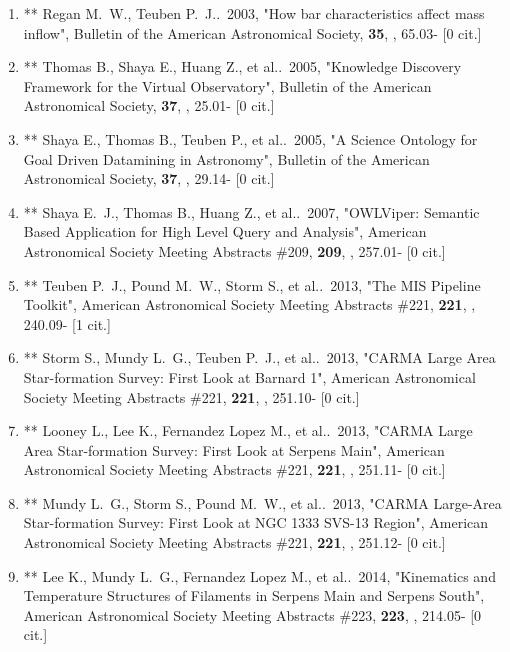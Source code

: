 \documentclass[11pt,letterpaper]{article}
\begin{document}
\begin{enumerate}[resume,label=\textbf{\arabic*}.]
\item   **
  Regan M.~W., Teuben P.~J..\  2003,  "How bar characteristics affect 
mass inflow", Bulletin of the American Astronomical Society,  {\bf 35}, , 
65.03- [0 cit.] %
\item  **
  Thomas B., Shaya E., Huang Z., et al..\  2005,  "Knowledge Discovery 
Framework for the Virtual Observatory", Bulletin of the American 
Astronomical Society,  {\bf 37}, , 25.01- [0 cit.] %

\item   **
  Shaya E., Thomas B., Teuben P., et al..\  2005,  "A Science Ontology 
for Goal Driven Datamining in Astronomy", Bulletin of the American 
Astronomical Society,  {\bf 37}, , 29.14- [0 cit.] %

\item  **
  Shaya E.~J., Thomas B., Huang Z., et al..\  2007,  "OWLViper: 
Semantic Based Application for High Level Query and Analysis", American 
Astronomical Society Meeting Abstracts \#209,  {\bf 209}, , 257.01- [0 
cit.] %

\item  **
  Teuben P.~J., Pound M.~W., Storm S., et al..\  2013,  "The MIS 
Pipeline Toolkit", American Astronomical Society Meeting Abstracts \#221,  
{\bf 221}, , 240.09- [1 cit.] %

\item   **
  Storm S., Mundy L.~G., Teuben P.~J., et al..\  2013,  "CARMA Large 
Area Star-formation Survey: First Look at Barnard 1", American Astronomical 
Society Meeting Abstracts \#221,  {\bf 221}, , 251.10- [0 cit.] %
\item   **
  Looney L., Lee K., Fernandez Lopez M., et al..\  2013,  "CARMA Large 
Area Star-formation Survey: First Look at Serpens Main", American 
Astronomical Society Meeting Abstracts \#221,  {\bf 221}, , 251.11- [0 
cit.] %

\item   **
  Mundy L.~G., Storm S., Pound M.~W., et al..\  2013,  "CARMA 
Large-Area Star-formation Survey: First Look at NGC 1333 SVS-13 Region", 
American Astronomical Society Meeting Abstracts \#221,  {\bf 221}, , 
251.12- [0 cit.] %

\item  **
  Lee K., Mundy L.~G., Fernandez Lopez M., et al..\  2014,  
"Kinematics and Temperature Structures of Filaments in Serpens Main and 
Serpens South", American Astronomical Society Meeting Abstracts \#223,  
{\bf 223}, , 214.05- [0 cit.] %


\end{enumerate}
\end{document}
